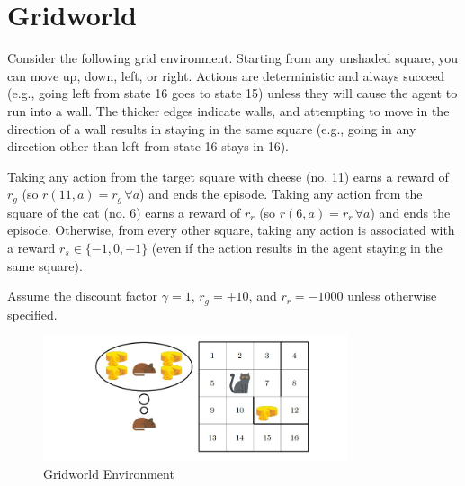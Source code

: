\documentclass[a3paper,12pt]{extarticle} %
\begin{document}
\newpage
\section{Gridworld}
Consider the following grid environment. Starting from any unshaded square, you can move up, down, left, or right. Actions are deterministic and always succeed (e.g., going left from state 16 goes to state 15) unless they will cause the agent to run into a wall. The thicker edges indicate walls, and attempting to move in the direction of a wall results in staying in the same square (e.g., going in any direction other than left from state 16 stays in 16).

Taking any action from the target square with cheese (no. 11) earns a reward of $r_g$ (so $r(11, a) = r_g \, \forall a$) and ends the episode. Taking any action from the square of the cat (no. 6) earns a reward of $r_r$ (so $r(6, a) = r_r \, \forall a$) and ends the episode. Otherwise, from every other square, taking any action is associated with a reward $r_s \in \{-1, 0, +1\}$ (even if the action results in the agent staying in the same square). 

Assume the discount factor $\gamma = 1$, $r_g = +10$, and $r_r = -1000$ unless otherwise specified.

\begin{figure}[H]
\centering
\includegraphics[width=0.8\textwidth]{grid.jpg}
\caption{Gridworld Environment}
\label{fig:gridworld}
\end{figure}
\end{document}
